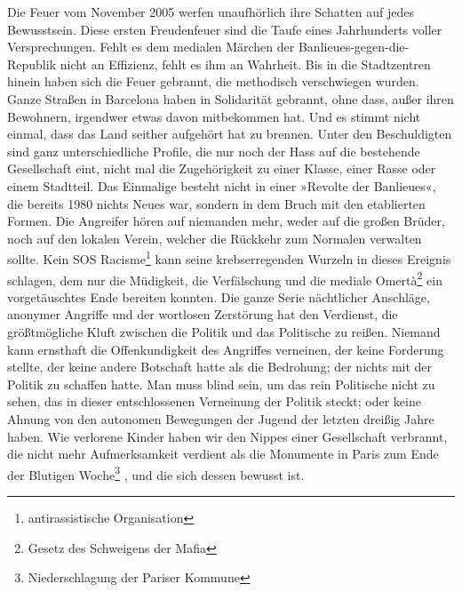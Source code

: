 Die Feuer vom November 2005 werfen unaufhörlich ihre Schatten auf
jedes Bewusstsein. Diese ersten Freudenfeuer sind die Taufe eines
Jahrhunderts voller Versprechungen. Fehlt es dem medialen Märchen
der Banlieues-gegen-die-Republik nicht an Effizienz, fehlt es ihm
an Wahrheit. Bis in die Stadtzentren hinein haben sich die Feuer
gebrannt, die methodisch verschwiegen wurden. Ganze Straßen in
Barcelona haben in Solidarität gebrannt, ohne dass, außer ihren
Bewohnern, irgendwer etwas davon mitbekommen hat. Und es stimmt
nicht einmal, dass das Land seither aufgehört hat zu brennen. Unter
den Beschuldigten sind ganz unterschiedliche Profile, die nur noch
der Hass auf die bestehende Gesellschaft eint, nicht mal die
Zugehörigkeit zu einer Klasse, einer Rasse oder einem Stadtteil.
Das Einmalige besteht nicht in einer »Revolte der Banlieues«, die
bereits 1980 nichts Neues war, sondern in dem Bruch mit den
etablierten Formen. Die Angreifer hören auf niemanden mehr, weder
auf die großen Brüder, noch auf den lokalen Verein, welcher die
Rückkehr zum Normalen verwalten sollte. Kein SOS Racisme\footnote{
antirassistische Organisation
}
kann
seine krebserregenden Wurzeln in dieses Ereignis schlagen, dem nur
die Müdigkeit, die Verfälschung und die mediale Omertà\footnote{
Gesetz des Schweigens der Mafia} 
ein
vorgetäuschtes Ende bereiten konnten. Die ganze Serie nächtlicher
Anschläge, anonymer Angriffe und der wortlosen Zerstörung hat den
Verdienst, die größtmögliche Kluft zwischen die Politik und das
Politische zu reißen. Niemand kann ernsthaft die Offenkundigkeit
des Angriffes verneinen, der keine Forderung stellte, der keine
andere Botschaft hatte als die Bedrohung; der nichts mit der
Politik zu schaffen hatte. Man muss blind sein, um das rein
Politische nicht zu sehen, das in dieser entschlossenen Verneinung
der Politik steckt; oder keine Ahnung von den autonomen Bewegungen
der Jugend der letzten dreißig Jahre haben. Wie verlorene Kinder
haben wir den Nippes einer Gesellschaft verbrannt, die nicht mehr
Aufmerksamkeit verdient als die Monumente in Paris zum Ende der
Blutigen Woche\footnote{
Niederschlagung der Pariser Kommune}%
, und die sich dessen bewusst ist.
\extrapar{}

